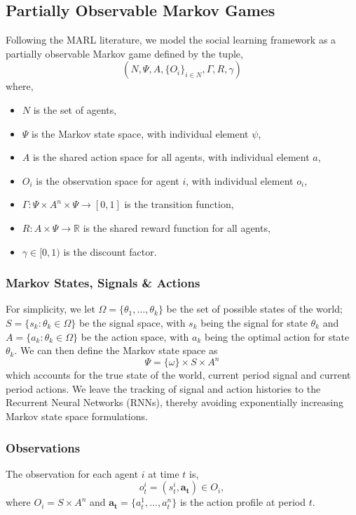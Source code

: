 \subsection*{Partially Observable Markov Games}
Following the MARL literature, we model the social learning framework as a partially observable Markov game defined by the tuple,
\[(N, \Psi, A, \{O_i\}_{i \in N}, \Gamma, R, \gamma)\]
where,
\begin{itemize}
\item $N$ is the set of agents,
\item $\Psi $ is the Markov state space, with individual element $\psi$,
\item $A$ is the shared action space for all agents, with individual element $a$,
\item $O_i$ is the observation space for agent $i$, with individual element $o_i$,
\item $\Gamma : \Psi \times A^n \times \Psi \to [0,1]$ is the transition function,
\item $R: A \times \Psi \to \mathbb{R}$ is the shared reward function for all agents,
\item $\gamma \in [0,1)$ is the discount factor.
\end{itemize}

\subsubsection*{Markov States, Signals \& Actions}
For simplicity, we let $\Omega = \{\theta_1, \ldots, \theta_k\}$ be the set of possible states of the world; $S = \{s_k : \theta_k \in \Omega\}$ be the signal space, with $s_k$ being the signal for state $\theta_k$ and $A = \{a_k : \theta_k \in \Omega\}$ be the action space, with $a_k$ being the optimal action for state $\theta_k$. We can then define the Markov state space as 
\begin{equation*}
    \Psi = \{\omega\} \times S \times A^n
\end{equation*}
which accounts for the true state of the world, current period signal and current period actions. We leave the tracking of signal and action histories to the Recurrent Neural Networks (RNNs), thereby avoiding exponentially increasing Markov state space formulations.

\subsubsection*{Observations}
The observation for each agent $i$ at time $t$ is,
\begin{equation*}
o^i_t = (s^i_t, \bm{a_t}) \in O_i,
\end{equation*}
where $O_i = S \times A^n$ and $\bm{a_t} = \{a_t^1, \ldots, a_t^n\}$ is the action profile at period $t$.

